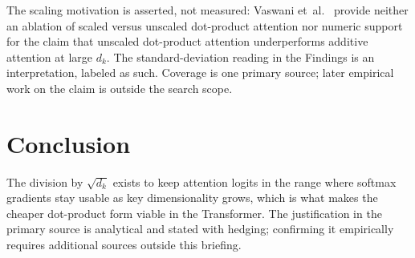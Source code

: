 \documentclass{article}
\begin{document}
The scaling motivation is asserted, not measured: Vaswani
et~al.~\citep{vaswani2017attention} provide neither an ablation of scaled
versus unscaled dot-product attention nor numeric support for the claim that
unscaled dot-product attention underperforms additive attention at large
$d_k$. The standard-deviation reading in the Findings is an interpretation,
labeled as such. Coverage is one primary source; later empirical work on the
claim is outside the search scope.

\section{Conclusion}

The division by $\sqrt{d_k}$ exists to keep attention logits in the range
where softmax gradients stay usable as key dimensionality grows, which is
what makes the cheaper dot-product form viable in the Transformer. The
justification in the primary source is analytical and stated with hedging;
confirming it empirically requires additional sources outside this briefing.



\end{document}
